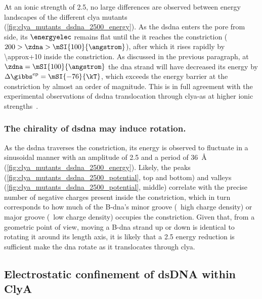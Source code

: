 At an ionic strength of \SI{2.5}{\Molar}, no large differences are observed between energy landscapes of the
different \gls{clya} mutants (\cref{fig:clya_mutants_dsdna_2500_energy}). As the \gls{dsdna} enters the pore
from \cisi{} side, its $\energyelec$ remains flat until the it reaches the constriction ($200 > \zdna >
\mSI{100}{\angstrom}$), after which it rises rapidly by \SI{\approx+10}{\kT} inside the constriction. As
discussed in the previous paragraph, at $\zdna = \mSI{100}{\angstrom}$ the \gls{dna} strand will have
decreased its energy by $\Delta \gibbs^{\textrm{ep}} = \mSI{-76}{\kT}$, which exceeds the energy barrier at
the constriction by almost an order of magnitude. This is in full agreement with the experimental observations
of \gls{dsdna} translocation through \gls{clya-as} at higher ionic
strengths~\cite{Franceschini-2013,Franceschini-2016}.

\subsubsection{The chirality of \gls{dsdna} may induce rotation.}
%

As the \gls{dsdna} traverses the constriction, its energy is observed to fluctuate in a sinusoidal manner with
an amplitude of \SI{2.5}{\kT} and a period of \SI{36}{\angstrom} (\cref{fig:clya_mutants_dsdna_2500_energy}).
Likely, the peaks (\cref{fig:clya_mutants_dsdna_2500_potential}, top and bottom) and valleys
(\cref{fig:clya_mutants_dsdna_2500_potential}, middle) correlate with the precise number of negative charges
present inside the constriction, which in turn corresponds to how much of the B-\gls{dna}'s minor groove
(\ie~high charge density) or major groove (\ie~low charge density) occupies the constriction. Given that, from
a geometric point of view, moving a B-\gls{dna} strand up or down is identical to rotating it around its
length axis, it is likely that a \SI{2.5}{\kT} energy reduction is sufficient make the \gls{dna} rotate as it
translocates through \gls{clya}.


\subsection{Electrostatic confinement of {dsDNA} within {ClyA}}
%


